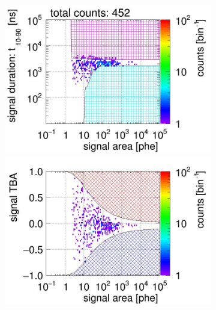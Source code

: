 \begin{landscape}
\begin{figure}[!p]
\begin{subfigure}[t]{0.32\textwidth}
			\caption{}
			\label{fig:signal selection dv 10 03}
		\end{subfigure}
		\begin{subfigure}[t]{0.32\textwidth}
			\centering
			\includegraphics[width=\figurewidth,clip,trim={0 98 0 15}]{Figures/GasTest/CutsValid/res64766/pdpa29Vecfig64766.jpg}
			\includegraphics[width=\figurewidth,clip,trim={0 98 0 40}]{Figures/GasTest/CutsValid/res64766/tbapa29Vecfig64766.jpg}

\end{subfigure}
\end{figure}
\end{landscape}

